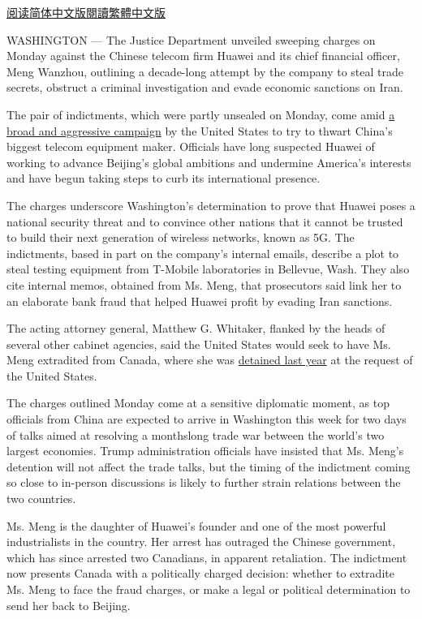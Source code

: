 \href{https://cn.nytimes.com/usa/20190129/meng-wanzhou-huawei-iran/}{阅读简体中文版}\href{https://cn.nytimes.com/usa/20190129/meng-wanzhou-huawei-iran/zh-hant/}{閱讀繁體中文版}

WASHINGTON --- The Justice Department unveiled sweeping charges on
Monday against the Chinese telecom firm Huawei and its chief financial
officer, Meng Wanzhou, outlining a decade-long attempt by the company to
steal trade secrets, obstruct a criminal investigation and evade
economic sanctions on Iran.

The pair of indictments, which were partly unsealed on Monday, come amid
\href{https://www.nytimes.com/2019/01/26/us/politics/huawei-china-us-5g-technology.html}{a
broad and aggressive campaign} by the United States to try to thwart
China's biggest telecom equipment maker. Officials have long suspected
Huawei of working to advance Beijing's global ambitions and undermine
America's interests and have begun taking steps to curb its
international presence.

The charges underscore Washington's determination to prove that Huawei
poses a national security threat and to convince other nations that it
cannot be trusted to build their next generation of wireless networks,
known as 5G. The indictments, based in part on the company's internal
emails, describe a plot to steal testing equipment from T-Mobile
laboratories in Bellevue, Wash. They also cite internal memos, obtained
from Ms. Meng, that prosecutors said link her to an elaborate bank fraud
that helped Huawei profit by evading Iran sanctions.

The acting attorney general, Matthew G. Whitaker, flanked by the heads
of several other cabinet agencies, said the United States would seek to
have Ms. Meng extradited from Canada, where she was
\href{https://www.nytimes.com/2018/12/05/business/huawei-cfo-arrest-canada-extradition.html}{detained
last year} at the request of the United States.

The charges outlined Monday come at a sensitive diplomatic moment, as
top officials from China are expected to arrive in Washington this week
for two days of talks aimed at resolving a monthslong trade war between
the world's two largest economies. Trump administration officials have
insisted that Ms. Meng's detention will not affect the trade talks, but
the timing of the indictment coming so close to in-person discussions is
likely to further strain relations between the two countries.

Ms. Meng is the daughter of Huawei's founder and one of the most
powerful industrialists in the country. Her arrest has outraged the
Chinese government, which has since arrested two Canadians, in apparent
retaliation. The indictment now presents Canada with a politically
charged decision: whether to extradite Ms. Meng to face the fraud
charges, or make a legal or political determination to send her back to
Beijing.

